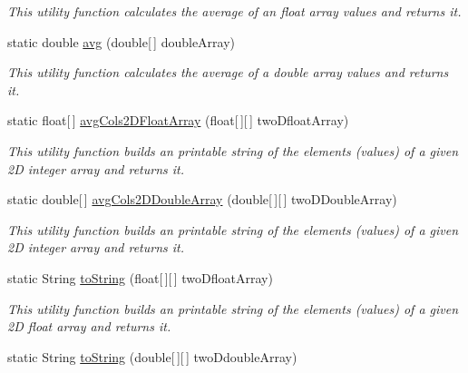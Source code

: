 \begin{DoxyCompactItemize}
\begin{DoxyCompactList}\small\item\em This utility function calculates the average of an float array values and returns it. \end{DoxyCompactList}\item 
static double \hyperlink{classuk_1_1ac_1_1dmu_1_1iesd_1_1cascade_1_1util_1_1_array_utils_a2d266e50a270075669cef98886715649}{avg} (double\mbox{[}$\,$\mbox{]} double\-Array)
\begin{DoxyCompactList}\small\item\em This utility function calculates the average of a double array values and returns it. \end{DoxyCompactList}\item 
static float\mbox{[}$\,$\mbox{]} \hyperlink{classuk_1_1ac_1_1dmu_1_1iesd_1_1cascade_1_1util_1_1_array_utils_ad10e9b8da896be89ea78d2106c37b454}{avg\-Cols2\-D\-Float\-Array} (float\mbox{[}$\,$\mbox{]}\mbox{[}$\,$\mbox{]} two\-Dfloat\-Array)
\begin{DoxyCompactList}\small\item\em This utility function builds an printable string of the elements (values) of a given 2\-D integer array and returns it. \end{DoxyCompactList}\item 
static double\mbox{[}$\,$\mbox{]} \hyperlink{classuk_1_1ac_1_1dmu_1_1iesd_1_1cascade_1_1util_1_1_array_utils_a8e51829da36c0b53ebbd03e0e6525789}{avg\-Cols2\-D\-Double\-Array} (double\mbox{[}$\,$\mbox{]}\mbox{[}$\,$\mbox{]} two\-D\-Double\-Array)
\begin{DoxyCompactList}\small\item\em This utility function builds an printable string of the elements (values) of a given 2\-D integer array and returns it. \end{DoxyCompactList}\item 
static String \hyperlink{classuk_1_1ac_1_1dmu_1_1iesd_1_1cascade_1_1util_1_1_array_utils_add757a9cf1f0022125147177ea206788}{to\-String} (float\mbox{[}$\,$\mbox{]}\mbox{[}$\,$\mbox{]} two\-Dfloat\-Array)
\begin{DoxyCompactList}\small\item\em This utility function builds an printable string of the elements (values) of a given 2\-D float array and returns it. \end{DoxyCompactList}\item 
static String \hyperlink{classuk_1_1ac_1_1dmu_1_1iesd_1_1cascade_1_1util_1_1_array_utils_a1f7fb8044637b0d02dc6153972c5926b}{to\-String} (double\mbox{[}$\,$\mbox{]}\mbox{[}$\,$\mbox{]} two\-Ddouble\-Array)

\end{DoxyCompactItemize}
